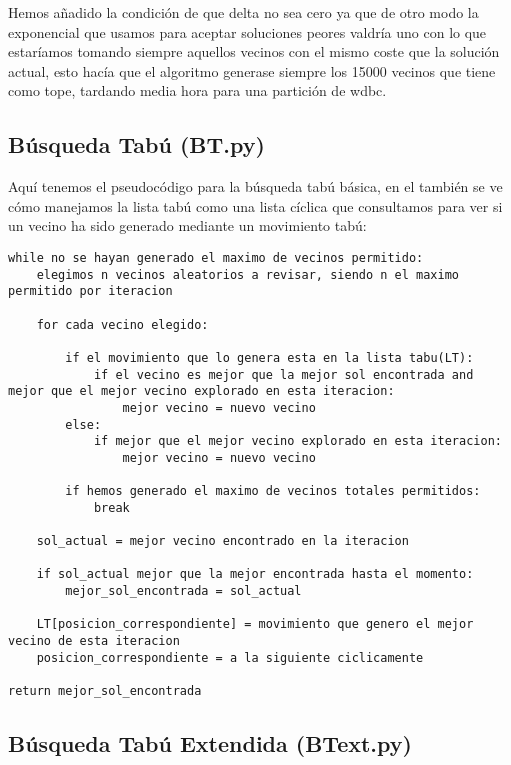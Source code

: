 \documentclass[10pt,a4paper]{article}
\begin{document}
Hemos añadido la condición de que delta no sea cero ya que de otro modo la exponencial que usamos para aceptar soluciones peores valdría uno con lo que estaríamos tomando siempre aquellos vecinos con el mismo coste que la solución actual, esto hacía que el algoritmo generase siempre los 15000 vecinos que tiene como tope, tardando media hora para una partición de wdbc.\\

\newpage
\subsection{\color[rgb]{0.0,0.0,0.51}Búsqueda Tabú (BT.py)}

Aquí tenemos el pseudocódigo para la búsqueda tabú básica, en el también se ve cómo manejamos la lista tabú como una lista cíclica que consultamos para ver si un vecino ha sido generado mediante un movimiento tabú:\\

\begin{lstlisting}
while no se hayan generado el maximo de vecinos permitido:
	elegimos n vecinos aleatorios a revisar, siendo n el maximo permitido por iteracion

	for cada vecino elegido:

		if el movimiento que lo genera esta en la lista tabu(LT):
			if el vecino es mejor que la mejor sol encontrada and mejor que el mejor vecino explorado en esta iteracion:
				mejor vecino = nuevo vecino
		else:
			if mejor que el mejor vecino explorado en esta iteracion:
				mejor vecino = nuevo vecino

		if hemos generado el maximo de vecinos totales permitidos:
			break

	sol_actual = mejor vecino encontrado en la iteracion

	if sol_actual mejor que la mejor encontrada hasta el momento:
		mejor_sol_encontrada = sol_actual

	LT[posicion_correspondiente] = movimiento que genero el mejor vecino de esta iteracion
	posicion_correspondiente = a la siguiente ciclicamente

return mejor_sol_encontrada
\end{lstlisting}

\newpage
\subsection{\color[rgb]{0.0,0.0,0.51}Búsqueda Tabú Extendida (BText.py)}
\end{document}
